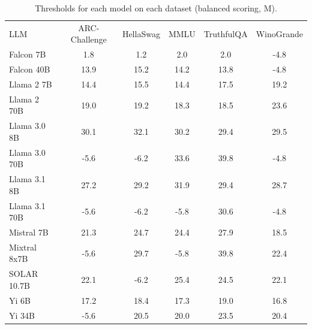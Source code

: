 \begin{table}[h]
\caption{Thresholds for each model on each dataset (balanced scoring, M). }
\label{tab:thresholds_logit_max_k20_w1}
\centering
\begin{tabular}{l S[table-format=3.1] S[table-format=3.1] S[table-format=3.1] S[table-format=3.1] S[table-format=3.1]}
\toprule
LLM & ARC-Challenge & HellaSwag & MMLU & TruthfulQA & WinoGrande \\ 
\cmidrule(lr){1-1} \cmidrule(lr){2-2} \cmidrule(lr){3-3} \cmidrule(lr){4-4} \cmidrule(lr){5-5} \cmidrule(lr){6-6}
Falcon 7B & 1.8 & 1.2 & 2.0 & 2.0 & -4.8\\
Falcon 40B & 13.9 & 15.2 & 14.2 & 13.8 & -4.8\\
Llama 2 7B & 14.4 & 15.5 & 14.4 & 17.5 & 19.2\\
Llama 2 70B & 19.0 & 19.2 & 18.3 & 18.5 & 23.6\\
Llama 3.0 8B & 30.1 & 32.1 & 30.2 & 29.4 & 29.5\\
Llama 3.0 70B & -5.6 & -6.2 & 33.6 & 39.8 & -4.8\\
Llama 3.1 8B & 27.2 & 29.2 & 31.9 & 29.4 & 28.7\\
Llama 3.1 70B & -5.6 & -6.2 & -5.8 & 30.6 & -4.8\\
Mistral 7B & 21.3 & 24.7 & 24.4 & 27.9 & 18.5\\
Mixtral 8x7B & -5.6 & 29.7 & -5.8 & 39.8 & 22.4\\
SOLAR 10.7B & 22.1 & -6.2 & 25.4 & 24.5 & 22.1\\
Yi 6B & 17.2 & 18.4 & 17.3 & 19.0 & 16.8\\
Yi 34B & -5.6 & 20.5 & 20.0 & 23.5 & 20.4\\
\bottomrule
\end{tabular}
\end{table}
